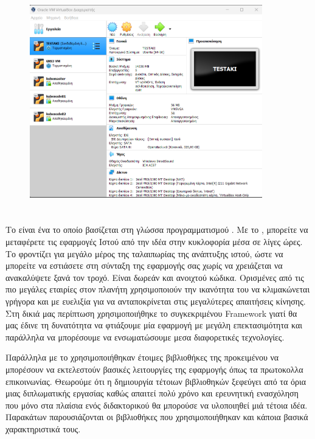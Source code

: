\begin{figure}[htb]
	\centering
	\includegraphics[width=0.9\textwidth]{graphics/virtualbox.PNG}
	\caption{ }
\end{figure}

\section{}

Το  είναι ένα  το οποίο βασίζεται στη γλώσσα προγραμματισμού . Με το , μπορείτε να μεταφέρετε τις εφαρμογές Ιστού από την ιδέα στην κυκλοφορία μέσα σε λίγες ώρες. Το  φροντίζει για μεγάλο μέρος
της ταλαιπωρίας της ανάπτυξης ιστού, ώστε να μπορείτε να εστιάσετε στη σύνταξη της εφαρμογής σας χωρίς να χρειάζεται να ανακαλύψετε ξανά τον τροχό.
Είναι δωρεάν και ανοιχτού κώδικα. Ορισμένες από τις πιο μεγάλες εταιρίες στον πλανήτη χρησιμοποιούν την ικανότητα του
να κλιμακώνεται γρήγορα και με ευελιξία για να ανταποκρίνεται στις μεγαλύτερες απαιτήσεις κίνησης. Στη δικιά μας περίπτωση χρησιμοποιήθηκε το συγκεκριμένου
{Framework} γιατί θα μας έδινε τη δυνατότητα να φτιάξουμε μία εφαρμογή με μεγάλη επεκτασιμότητα και παράλληλα να μπορέσουμε να ενσωματώσουμε μεσα διαφορετικές τεχνολογίες.

Παράλληλα με το  χρησιμοποιήθηκαν έτοιμες βιβλιοθήκες της  προκειμένου να μπορέσουν να εκτελεστούν βασικές λειτουργίες της εφαρμογής όπως 
τα πρωτοκολλα επικοινωνίας. Θεωρούμε ότι η δημιουργία τέτοιων βιβλιοθηκών ξεφεύγει από τα όρια μιας διπλωματικής εργασίας καθώς απαιτεί πολύ χρόνο και ερευνητική
ενασχόληση που μόνο στα πλαίσια ενός διδακτορικού θα μπορούσε να υλοποιηθεί μιά τέτοια ιδέα. Παρακάτων παρουσιάζονται οι βιβλιοθήκες που χρησιμοποιήθηκαν και κάποια βασικά χαρακτηριστικά τους.

